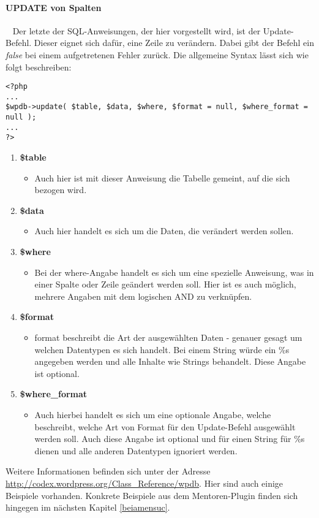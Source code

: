 \paragraph{UPDATE von Spalten}\label{update}\ \newline
Der letzte der SQL-Anweisungen, der hier vorgestellt wird, ist der Update-Befehl. Dieser eignet sich dafür, eine Zeile zu verändern. Dabei gibt der Befehl ein \emph{false} bei einem aufgetretenen Fehler zurück.\newline
Die allgemeine Syntax lässt sich wie folgt beschreiben:
\begin{lstlisting}
<?php 
...
$wpdb->update( $table, $data, $where, $format = null, $where_format = null ); 
...
?> 
\end{lstlisting}
\begin{enumerate}
	\item \textbf{\$table}
	\begin{itemize}
		\item Auch hier ist mit dieser Anweisung die Tabelle gemeint, auf die sich bezogen wird.
	\end{itemize}
	\item \textbf{\$data}
	\begin{itemize}
		\item Auch hier handelt es sich um die Daten, die verändert werden sollen.
	\end{itemize}
	\item \textbf{\$where}
	\begin{itemize}
		\item Bei der where-Angabe handelt es sich um eine spezielle Anweisung, was in einer Spalte oder Zeile geändert werden soll. Hier ist es auch möglich, mehrere Angaben mit dem logischen AND zu verknüpfen.
	\end{itemize}
	\item \textbf{\$format}
	\begin{itemize}
		\item format beschreibt die Art der ausgewählten Daten - genauer gesagt um welchen Datentypen es sich handelt. Bei einem String würde ein \%s angegeben werden und alle Inhalte wie Strings behandelt. Diese Angabe ist optional.
	\end{itemize}
	\item \textbf{\$where\_format}
	\begin{itemize}
		\item Auch hierbei handelt es sich um eine optionale Angabe, welche beschreibt, welche Art von Format für den Update-Befehl ausgewählt werden soll. Auch diese Angabe ist optional und für einen String für \%s dienen und alle anderen Datentypen ignoriert werden.
	\end{itemize}
\end{enumerate}
Weitere Informationen befinden sich unter der Adresse \url{http://codex.wordpress.org/Class_Reference/wpdb}. Hier sind auch einige Beispiele vorhanden. Konkrete Beispiele aus dem Mentoren-Plugin finden sich hingegen im nächsten Kapitel \ref{beiamensuc}.
